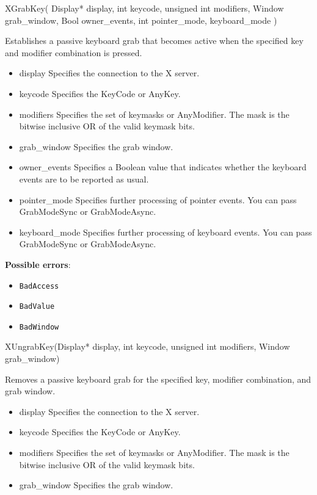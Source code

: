 \documentclass{report}
\begin{document}
\begin{itemize}
        \begin{cppcode}
            XGrabKey(
                Display* display,
                int keycode,
                unsigned int modifiers,
                Window grab_window,
                Bool owner_events,
                int pointer_mode, keyboard_mode
            )
        \end{cppcode}
        \bigbreak \noindent
        Establishes a passive keyboard grab that becomes active when the specified key and modifier combination is pressed.
        \begin{itemize}
            \item display Specifies the connection to the X server.
            \item keycode Specifies the KeyCode or AnyKey.
            \item modifiers Specifies the set of keymasks or AnyModifier. The mask is the bitwise inclusive OR of the valid keymask bits.
            \item grab\_window Specifies the grab window.
            \item owner\_events Specifies a Boolean value that indicates whether the keyboard events are to be reported as usual.
            \item pointer\_mode Specifies further processing of pointer events. You can pass GrabModeSync or GrabModeAsync.
            \item keyboard\_mode Specifies further processing of keyboard events. You can pass GrabModeSync or GrabModeAsync.
        \end{itemize}
        \textbf{Possible errors}:
        \begin{itemize}
            \item \texttt{BadAccess}
            \item \texttt{BadValue}
            \item \texttt{BadWindow}
        \end{itemize}

        \begin{cppcode}
            XUngrabKey(Display* display, int keycode, unsigned int modifiers, Window grab_window)
        \end{cppcode}
        \bigbreak \noindent
        Removes a passive keyboard grab for the specified key, modifier combination, and grab window.

        \begin{itemize}
            \item display Specifies the connection to the X server.
            \item keycode Specifies the KeyCode or AnyKey.
            \item modifiers Specifies the set of keymasks or AnyModifier. The mask is the bitwise inclusive OR of the valid keymask bits.
            \item grab\_window Specifies the grab window.
        \end{itemize}


\end{itemize}
\end{document}
